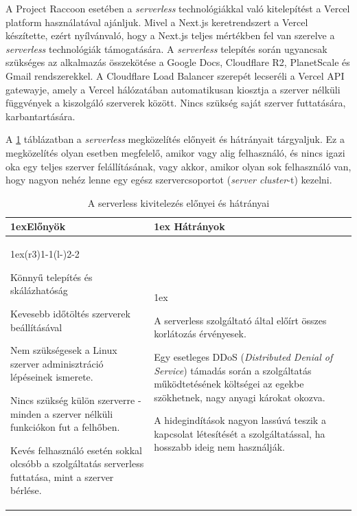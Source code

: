 A Project Raccoon esetében a \textit{serverless} technológiákkal való kitelepítést a Vercel platform használatával ajánljuk. Mivel a Next.js keretrendszert a Vercel készítette, ezért nyílvánvaló, hogy a Next.js teljes mértékben fel van szerelve a \textit{serverless} technológiák támogatására. A \textit{serverless} telepítés során ugyancsak szükséges az alkalmazás összekötése a Google Docs, Cloudflare R2, PlanetScale és Gmail rendszerekkel. A Cloudflare Load Balancer szerepét lecseréli a Vercel API gatewayje, amely a Vercel hálózatában automatikusan kiosztja a szerver nélküli függvények a kiszolgáló szerverek között. Nincs szükség saját szerver futtatására, karbantartására.

A \ref{serverlessprocon} táblázatban a \textit{serverless} megközelítés előnyeit és hátrányait tárgyaljuk. Ez a megközelítés olyan esetben megfelelő, amikor vagy alig felhasználó, és nincs igazi oka egy teljes szerver felállításának, vagy akkor, amikor olyan sok felhasználó van, hogy nagyon nehéz lenne egy egész szervercsoportot (\textit{server cluster}-t) kezelni.

\begin{table}
\begin{tabularx}{\linewidth}{>{\parskip1ex}X@{\kern4\tabcolsep}>{\parskip1ex}X}
\toprule
\hfil\bfseries Előnyök
&
\hfil\bfseries Hátrányok
\\\cmidrule(r{3\tabcolsep}){1-1}\cmidrule(l{-\tabcolsep}){2-2}

Könnyű telepítés és skálázhatóság\par
Kevesebb időtöltés szerverek beállításával\par
Nem szükségesek a Linux szerver adminisztráció lépéseinek ismerete.\par
Nincs szükség külön szerverre - minden a szerver nélküli funkciókon fut a felhőben.\par
Kevés felhasználó esetén sokkal olcsóbb a szolgáltatás serverless futtatása, mint a szerver bérlése.\par

&

A serverless szolgáltató által előírt összes korlátozás érvényesek.\par
Egy esetleges DDoS (\textit{Distributed Denial of Service}) támadás során a szolgáltatás működtetésének költségei az egekbe szökhetnek, nagy anyagi károkat okozva.\par
A hidegindítások nagyon lassúvá teszik a kapcsolat létesítését a szolgáltatással, ha hosszabb ideig nem használják.\par

\\\bottomrule
\end{tabularx}
\caption{A serverless kivitelezés előnyei és hátrányai}
\label{serverlessprocon}
\end{table}

